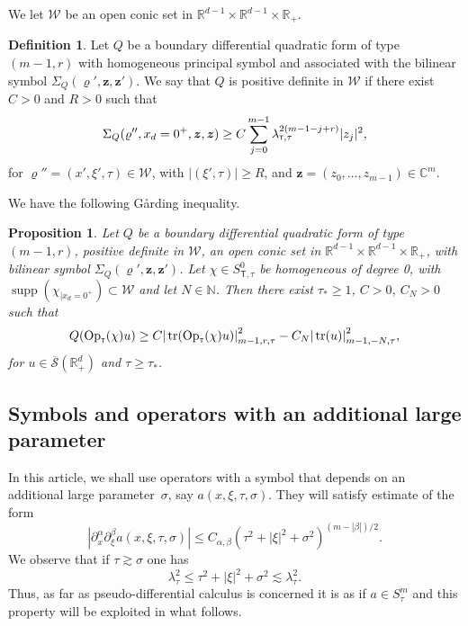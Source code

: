 \documentclass[10pt]{amsart}
\theoremstyle{plain}
\newtheorem{proposition}[theorem]{Proposition}
\theoremstyle{definition}
\newtheorem{definition}[theorem]{Definition}
\def\R{\mathbb{R}}
\def\C{\mathbb{C}}
\def\N{\mathbb{N}}
\let\Bquad Q
\let\y\varrho
\let \Re \relax
\DeclareMathOperator{\Re}{Re}
\newcommand{\un}[1]{\Sigma_{#1}}
\newcommand{\z}{\boldsymbol{z}}
\newcommand{\br}{\ensuremath{_{|x_d=0^+}}}
\newcommand{\Opt}{\ensuremath{\mathrm{Op}_{\scriptscriptstyle{\mathsf{T}}}}}
\newcommand{\normsc}[2]{{| #1 |}_{#2, \tau}}
\newcommand{\lsc}{\lambda_\tau}
\newcommand{\lsct}{\lambda_{{\scriptscriptstyle{\mathsf T}},\tau}}
\newcommand{\Ssc}{S_\tau}
\newcommand{\Ssct}{S_{{\scriptscriptstyle{\mathsf T}},\tau}}
\newcommand{\Sbarp}{\ensuremath{\overline{\mathscr{S}}(\Rdp)}}
\newcommand{\Rdp}{\R^d_+}
\DeclareMathOperator{\supp}{supp}
\DeclareMathOperator{\trace}{tr}
\begin{document}
We let $\mathscr W$ be an open conic set in $\R^{d-1} \times \R^{d-1} \times \R_+$.

\skpt
\begin{definition}
Let $\Bquad$ be a boundary differential quadratic form of type \hbox{$(m-1,r)$} with
homogeneous principal symbol and
associated with the bilinear symbol $\un{\Bquad}(\y',\z,\z')$. We say that $\Bquad$ is
positive definite in $\mathscr W$ if there exist $C>0$ and $R>0$ such that
\begin{equation*}
\Re \un{\Bquad}(\y'', x_d = 0^+, \z,\z)\geq
C\sum_{j=0}^{m-1} \lsct^{2(m-1-j+r)}|z_j|^2,
\end{equation*}
for $\y''=(x',\xi',\tau) \in \mathscr W$, with $|(\xi', \tau)| \geq
R$, and
$\z=(z_0,\dots,z_{m-1})\in \C^m$.
\end{definition}

We have the following G{\aa}rding inequality.

\begin{proposition}
\label{prop: boundary form -Gaarding tangentiel}
Let $\Bquad$ be a boundary differential quadratic form of type $(m-1,r)$,
positive definite in $\mathscr W$, an open conic set in $\R^{d-1}
\times \R^{d-1} \times \R_+$, with bilinear symbol
$\un{\Bquad}(\y',\z,\z')$. Let $\chi \in \Ssct^0$ be homogeneous of
degree 0, with $\supp(\chi\br)\subset \mathscr W$ and let $N\in \N$. Then
there exist $\tau_\ast\geq 1$, $C>0$, $C_N >0$ such that
\begin{equation*}
\Re \Bquad(\Opt(\chi) u)
\geq C\normsc{\trace(\Opt(\chi) u)}{m-1,r}^2
-C_N\normsc{\trace(u)}{m-1,-N}^2,
\end{equation*}
for $u\in \Sbarp$ and $\tau\geq\tau_\ast$.
\end{proposition}

\subsection{Symbols and operators with an additional large parameter}
\label{sec: calculus with spectral parameter}
In this article, we shall use operators with a symbol that depends
on an additional large parameter~$\sigma$, say $a(x,\xi,\tau,\sigma)$. They
will satisfy estimate of the form\vspace*{-3pt}
\begin{equation*}
|\partial^{\alpha}_x\partial^{\beta}_{\xi}a(x,\xi,\tau,\sigma)|\leq
C_{\alpha,\beta}(\tau^2+|\xi|^2+\sigma^2)^{(m-|\beta|)/2}.
\end{equation*}
We observe that if $\tau\gtrsim \sigma$ one has\vspace*{-3pt}\enlargethispage{.5\baselineskip}
\begin{equation*}
\lsc^2 \leq \tau^2+|\xi|^2+\sigma^2 \lesssim \lsc^2.
\end{equation*}
Thus, as far as pseudo-differential calculus is concerned it is as if
$a\in \Ssc^m$ and this property will be
exploited in what follows.
\end{document}
